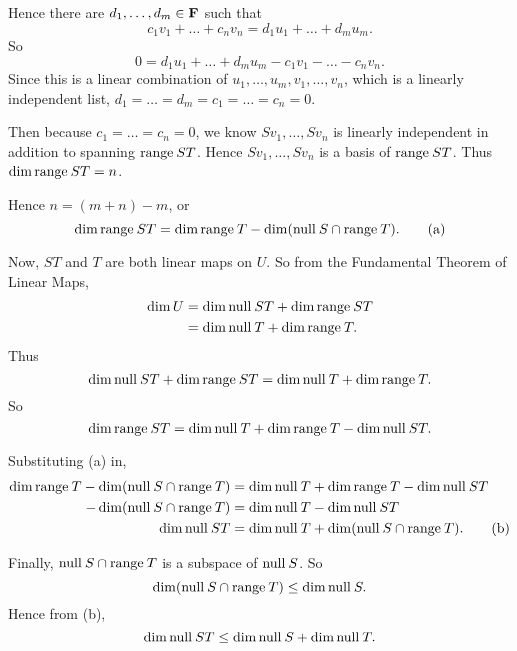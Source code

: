 \documentclass[a5paper]{article}
\begin{document}
    Hence there are $d_1,\dots,d_m \in \mathbf{F}$ such that
\begin{equation*}
        c_1v_1 + \dots + c_nv_n = d_1u_1 + \dots + d_mu_m .
\end{equation*}
    So
\begin{equation*}
        0 = d_1u_1 + \dots + d_mu_m - c_1v_1 - \dots - c_nv_n .
\end{equation*}
    Since this is a linear combination of $u_1,\dots,u_m,v_1,\dots,v_n$, which is a linearly independent list, $d_1=\dots=d_m=c_1=\dots=c_n=0$.

    Then because $c_1=\dots=c_n=0$, we know $Sv_1,\dots,Sv_n$ is linearly independent in addition to spanning $\text{range\:} ST$.
    Hence $Sv_1,\dots,Sv_n$ is a basis of $\text{range\:} ST$.
    Thus $\dim \text{range\:} ST = n$.

    Hence $n = (m + n) - m$, or
\begin{equation*}
        \dim \text{range\:} ST = \dim \text{range\:} T - \dim (\text{null\:} S \cap \text{range\:} T) . \tag{a}
\end{equation*}

    Now, $ST$ and $T$ are both linear maps on $U$.
    So from the Fundamental Theorem of Linear Maps,
\begin{align*}
        \dim U &= \dim \text{null\:} ST + \dim \text{range\:} ST \\
               &= \dim \text{null\:} T + \dim \text{range\:} T .
\end{align*}
    Thus
\begin{equation*}
        \dim \text{null\:} ST + \dim \text{range\:} ST = \dim \text{null\:} T + \dim \text{range\:} T .
\end{equation*}
    So
\begin{equation*}
        \dim \text{range\:} ST = \dim \text{null\:} T + \dim \text{range\:} T - \dim \text{null\:} ST .
\end{equation*}

    Substituting (a) in,
\begin{align*}
       \dim \text{range\:} T - \dim (\text{null\:} S \cap \text{range\:} T) &= \dim \text{null\:} T + \dim \text{range\:} T - \dim \text{null\:} ST \\
                     - \dim (\text{null\:} S \cap \text{range\:} T) &= \dim \text{null\:} T - \dim \text{null\:} ST \\
                                      \dim \text{null\:} ST &= \dim \text{null\:} T + \dim (\text{null\:} S \cap \text{range\:} T) . \tag{b}
\end{align*}

    Finally, $\text{null\:} S \cap \text{range\:} T$ is a subspace of $\text{null\:} S$.
    So
\begin{equation*}
        \dim (\text{null\:} S \cap \text{range\:} T) \le \dim \text{null\:} S .
\end{equation*}
    Hence from (b),
\begin{equation*}
        \dim \text{null\:} ST \le \dim \text{null\:} S + \dim \text{null\:} T .
\end{equation*}
\end{document}
